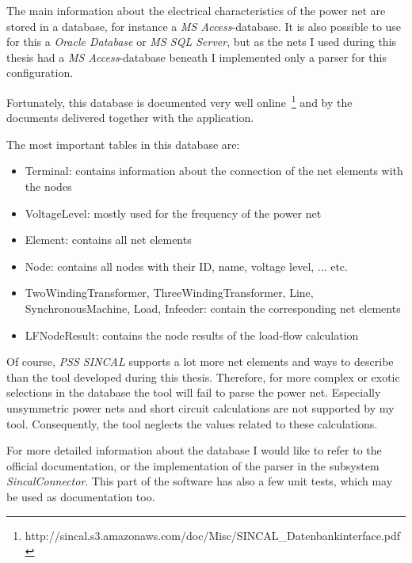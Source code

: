 The main information about the electrical characteristics of the power net are stored in a database, for instance a \emph{MS Access}-database. It is also possible to use for this a \emph{Oracle Database} or \emph{MS SQL Server}, but as the nets I used during this thesis had a \emph{MS Access}-database beneath I implemented only a parser for this configuration.

Fortunately, this database is documented very well \mbox{online \footnote{http://sincal.s3.amazonaws.com/doc/Misc/SINCAL\_Datenbankinterface.pdf}} and by the documents delivered together with the application.

The most important tables in this database are:
\begin{itemize}
	\item Terminal: contains information about the connection of the net elements with the nodes
	\item VoltageLevel: mostly used for the frequency of the power net
	\item Element: contains all net elements
	\item Node: contains all nodes with their ID, name, voltage level, ... etc.
	\item TwoWindingTransformer, ThreeWindingTransformer, Line, SynchronousMachine, Load, Infeeder: contain the corresponding net elements
	\item LFNodeResult: contains the node results of the load-flow calculation
\end{itemize}

Of course, \emph{PSS SINCAL} supports a lot more net elements and ways to describe than the tool developed during this thesis. Therefore, for more complex or exotic selections in the database the tool will fail to parse the power net. Especially unsymmetric power nets and short circuit calculations are not supported by my tool. Consequently, the tool neglects the values related to these calculations.

For more detailed information about the database I would like to refer to the official documentation, or the implementation of the parser in the subsystem \emph{SincalConnector}. This part of the software has also a few unit tests, which may be used as documentation too.